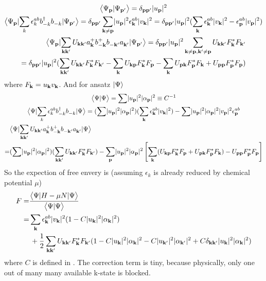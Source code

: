 \begin{gather}
\avt{\Psi_{\vp}}{\Psi_{\vp^{\prime}}}=\delta_{\vp\vp^{\prime}}\abs{u_{\vp}}^{2}\\
\avs{\Psi_{\vp}}{\sum_{k}\epsilon^{ab}_{k}b^{\dg}_{-k}b^{}_{-k}}{\Psi_{\vp^{\prime}}}
=\delta_{\vp\vp^{\prime}}\sum_{\vk\neq\vp}\abs{u_{\vp}}^{2}\epsilon^{ab}_{\vk}\abs{v_{\vk}}^{2}
=\delta_{\vp\vp^{\prime}}\abs{u_{\vp}}^{2}(\sum_{\vk}\epsilon^{ab}_{\vk}\abs{v_{\vk}}^{2}-\epsilon^{ab}_{\vp}\abs{v_{\vp}}^{2})\\
\begin{split}
\avs{\Psi_{\vp}}{\sum_{\vk\vk'}U_{\vk\vk'}a^+_\vk{}b^+_{-\vk}{}b^{}_{-\vk'}a^{}_{\vk'}}{\Psi_{\vp^{\prime}}}
=\delta_{\vp\vp^{\prime}}\abs{u_{\vp}}^{2}\sum_{\vk\neq\vp,\vk^{\prime}\neq\vp}U_{\vk\vk^{\prime}}F^{*}_{\vk}F_{\vk^{\prime}}\\
=\delta_{\vp\vp^{\prime}}\abs{u_{\vp}}^{2}(\sum_{\vk\vk^{\prime}}
	U_{\vk\vk^{\prime}}F^{*}_{\vk}F_{\vk^{\prime}}-\sum_{\vk}U_{\vk\vp}F^{*}_{\vk}F_{\vp}-\sum_{\vk}U_{\vp\vk}F^{*}_{\vp}F_{\vk}+U_{\vp\vp}F^{*}_{\vp}F_{\vp})
\end{split}
\end{gather}
where $F_{\vk}=u_{\vk}v_{\vk}$. And for ansatz $\ket{\Psi}$
\begin{gather}
\avt{\Psi}{\Psi}=\sum\abs{u_{\vp}}^{2}\abs{\alpha_{\vp}}^{2}\equiv{C^{-1}}\label{eq:20100908:C}\\
\avs{\Psi}{\sum_{k}\epsilon^{ab}_{k}b^{\dg}_{-k}b^{}_{-k}}{\Psi}
=(\sum\abs{u_{\vp}}^{2}\abs{\alpha_{\vp}}^{2})(\sum_{\vk}\epsilon^{ab}_{\vk}\abs{v_{\vk}}^{2})
	-\sum\abs{u_{\vp}}^{2}\abs{\alpha_{\vp}}^{2}\abs{v_{\vp}}^{2}\epsilon^{ab}_{\vp}\\
	\begin{split}
&\avs{\Psi}{\sum_{\vk\vk'}U_{\vk\vk'}a^+_\vk{}b^+_{-\vk}{}b^{}_{-\vk'}a^{}_{\vk'}}{\Psi}\\
=&(\sum\abs{u_{\vp}}^{2}\abs{\alpha_{\vp}}^{2})(\sum_{\vk\vk^{\prime}}
	U_{\vk\vk^{\prime}}F^{*}_{\vk}F_{\vk^{\prime}})-\sum_{\vp}\abs{u_{\vp}}^{2}\abs{\alpha_{\vp}}^{2}\mbr{\sum_{\vk}(U_{\vk\vp}F^{*}_{\vk}F_{\vp}+U_{\vp\vk}F^{*}_{\vp}F_{\vk})-U_{\vp\vp}F^{*}_{\vp}F_{\vp}}
	\end{split}
\end{gather}
So the expection of free envery is (assuming $\epsilon_{k}$ is already reduced by chemical potential $\mu$)
\begin{equation}
\begin{split}
F=&\frac{\avs{\Psi}{H-\mu{N}}{\Psi}}{\avt{\Psi}{\Psi}}\\
 =&\sum_{\vk}\epsilon^{ab}_{\vk}\abs{v_{\vk}}^{2}(1-C\abs{u_{\vk}}^{2}\abs{\alpha_{\vk}}^{2})\\
 &\,+\nth{2}\sum_{\vk\vk^{\prime}}	U_{\vk\vk^{\prime}}F^{*}_{\vk}F_{\vk^{\prime}}
 	(1-C\abs{u_{\vk}}^{2}\abs{\alpha_{\vk}}^{2}-C\abs{u_{\vk^{\prime}}}^{2}\abs{\alpha_{\vk^{\prime}}}^{2}
		+C\delta_{\vk\vk^{\prime}}\abs{u_{\vk}}^{2}\abs{\alpha_{\vk}}^{2})
 \end{split}
\end{equation}
where $C$ is defined in .  The correction term is tiny,  because physically, only one out of many many available k-state is blocked.  